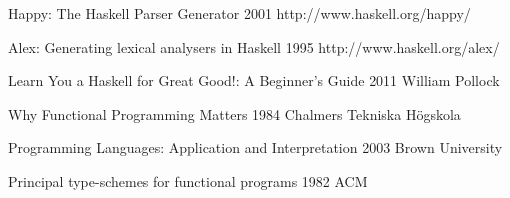 
\begingroup
\renewcommand{\section}[2]{}%

\begin{thebibliography}{99}

  {Happy: The Haskell Parser Generator}
  {2001}
  {http://www.haskell.org/happy/}

  {Alex: Generating lexical analysers in Haskell}
  {1995}
  {http://www.haskell.org/alex/}

  {Learn You a Haskell for Great Good!: A Beginner's Guide}
  {2011}
  {William Pollock}

  {Why Functional Programming Matters}
  {1984}
  {Chalmers Tekniska Högskola}

  {Programming Languages: Application and Interpretation}
  {2003}
  {Brown University}

  {Principal type-schemes for functional programs}
  {1982}
  {ACM}

\end{thebibliography}

\endgroup